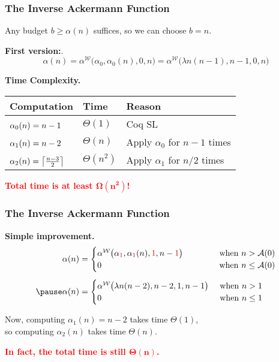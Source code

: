 \begin{frame}
\frametitle{The Inverse Ackermann Function}

Any budget $b \ge \alpha(n)$ suffices, so we can choose $b = n$.

\smallskip

\pause
\textbf{First version:}.
\pause
\begin{equation*}
\alpha(n) = \alpha^{\mathcal{W}}\big(\alpha_0, \alpha_0(n), 0, n\big)
= \alpha^{\mathcal{W}}\big(\lambda n(n - 1), n - 1, 0, n\big)
\end{equation*}

\pause
\textbf{Time Complexity.}

\vspace{5pt}

\begin{tabular}{l|l|l}
Computation & Time & Reason \\ \hline
$\topspace{2pt} \alpha_0(n) = n - 1$ & $\Theta(1)$ & Coq SL \\
$\topspace{2pt} \alpha_1(n) = n - 2$ & $\Theta(n)$ & Apply $\alpha_0$ for $n - 1$ times \\
$\topspace{2pt} \alpha_2(n) = \left \lceil \frac{n-3}{2} \right \rceil$ & $\Theta(n^2)$ & Apply $\alpha_1$ for $n/2$ times
\end{tabular}

\vspace{7pt}

\textcolor{red}{\textbf{Total time is at least $\mathbf{\Omega(n^2)}$!}}

\end{frame}


\begin{frame}
\frametitle{The Inverse Ackermann Function}

\textbf{Simple improvement.}
\pause
\begin{equation*}
\begin{aligned}
\alpha(n) & = \begin{cases}
\alpha^{\mathcal{W}}\big(\alpha_{{\color{red} 1}}, \alpha_{{\color{red} 1}}(n), {{\color{red} 1}}, n - {{\color{red} 1}}\big) & \hspace{3em}\text{ when } n > \Ack(0) \\
0 & \hspace{3em}\text{ when } n \le \Ack(0)
\end{cases} \\[5pt]
\pause \alpha(n) & = \begin{cases}
\alpha^{\mathcal{W}}\big(\lambda n(n - 2), n - 2, 1, n - 1\big) & \text{ when } n > 1 \\
0 & \text{ when } n \le 1
\end{cases}
\end{aligned}
\end{equation*}

\pause
Now, computing $\alpha_1(n) = n - 2$ takes time $\Theta(1)$,\\
so computing $\alpha_2(n)$ takes time $\Theta(n)$.

\bigskip
\pause
\textcolor{red}{\textbf{In fact, the total time is still $\mathbf{\Theta(n)}$.}}

\end{frame}


